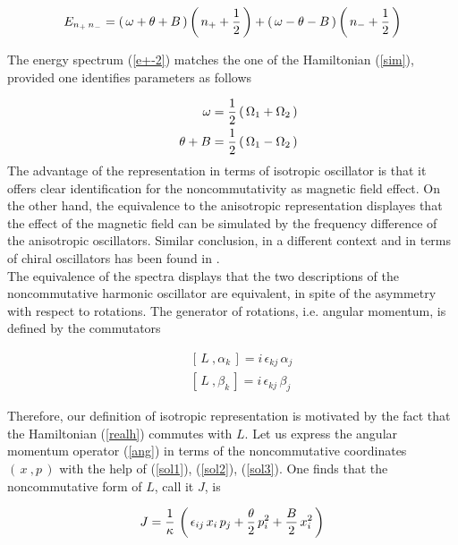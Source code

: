 \documentclass[a4paper,aps,prd,preprint]{revtex4}
\begin{document}
   \begin{equation}
    E_{n_+\, n_-}=  
    \left(\, \omega +\theta +B\,\right)\left(\,  n_+ + {1\over 2}\,\right)
    +\left(\, \omega -\theta -B\,\right)\left(\,  n_- + {1\over 2}\,\right)
    \label{e+-2}
    \end{equation}
   
   The energy spectrum (\ref{e+-2}) matches the one of the
   Hamiltonian  (\ref{sim}), provided one identifies parameters as follows
   
   \begin{eqnarray}
  && \omega= {1\over 2}\left(\, \Omega_1 + \Omega_2\, \right)\\
   && \theta +B= {1\over 2}\left(\, \Omega_1 - \Omega_2\, \right)
   \end{eqnarray}
   The advantage of 
    the representation in terms of isotropic oscillator is that it offers  
    clear identification for the noncommutativity as magnetic field effect. 
    On the other hand, the equivalence to the anisotropic representation 
    displayes that the effect of the magnetic field can be simulated by the 
    frequency difference of the anisotropic oscillators. Similar conclusion,
    in a different context and in terms of chiral oscillators has been found 
    in \cite{baner}.\\ 
    The equivalence of the spectra displays that the two descriptions of the
    noncommutative harmonic  oscillator are equivalent, in spite of the
    asymmetry with respect to rotations.  The generator of  rotations, i.e. 
    angular momentum, is defined by the commutators 
  
    \begin{eqnarray}
    &&\left[\, L\ , \alpha_k\,\right]= i\,\epsilon_{kj}\,\alpha_j\, \label{c1}\\
    && \left[\, L\ , \beta_k\,\right]= i\,\epsilon_{kj}\,\beta_j \label{c2}
    \end{eqnarray}
    
    Therefore, our definition of isotropic representation is motivated by
    the fact that the Hamiltonian (\ref{realh}) commutes with $L$.
    Let us express the angular momentum operator (\ref{ang}) in terms 
    of the noncommutative coordinates $(\, x\ , p\,)$  with the help of
    (\ref{sol1}),   (\ref{sol2}),  (\ref{sol3}).  One finds that the 
    noncommutative form of $L$, call it $J$, is
   
    
    \begin{equation}
    J={1\over \kappa }\,\left(\, \epsilon_{ij}\, x_i\, p_j + {\theta\over 2}\,
    p_i^2
    + {B\over 2}\, x_i^2\,\right)\label{j}
    \end{equation}
    
\end{document}
